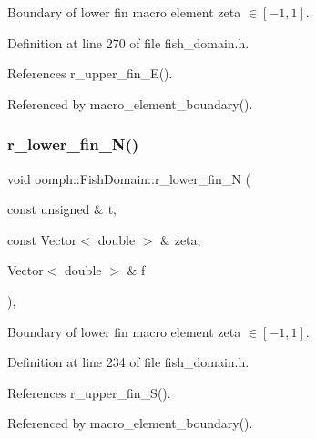 Boundary of lower fin macro element zeta $ \in [-1,1] $. 



Definition at line 270 of file fish\+\_\+domain.\+h.



References r\+\_\+upper\+\_\+fin\+\_\+\+E().



Referenced by macro\+\_\+element\+\_\+boundary().

\mbox{\label{classoomph_1_1FishDomain_a6d45dba13043b2b6df831848da665f21}} 
\subsubsection{\texorpdfstring{r\+\_\+lower\+\_\+fin\+\_\+\+N()}{r\_lower\_fin\_N()}}
{\footnotesize\ttfamily void oomph\+::\+Fish\+Domain\+::r\+\_\+lower\+\_\+fin\+\_\+N (\begin{DoxyParamCaption}\item[{const unsigned \&}]{t,  }\item[{const Vector$<$ double $>$ \&}]{zeta,  }\item[{Vector$<$ double $>$ \&}]{f }\end{DoxyParamCaption})\hspace{0.3cm}{\ttfamily [inline]}, {\ttfamily [private]}}



Boundary of lower fin macro element zeta $ \in [-1,1] $. 



Definition at line 234 of file fish\+\_\+domain.\+h.



References r\+\_\+upper\+\_\+fin\+\_\+\+S().



Referenced by macro\+\_\+element\+\_\+boundary().

\mbox{\label{classoomph_1_1FishDomain_a2110fb0b776654460d6a3477fbc4979d}} 
